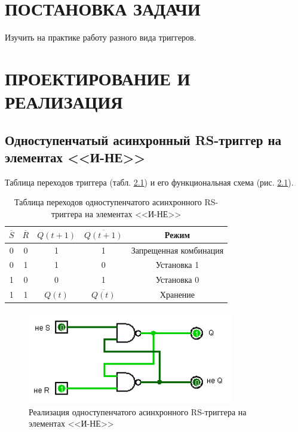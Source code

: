 \documentclass{mirea}
\author     {Краснов Н.O.}
\begin{document}
	
\chapter{ПОСТАНОВКА ЗАДАЧИ}
	Изучить на практике работу разного вида триггеров.
	
\chapter{ПРОЕКТИРОВАНИЕ И РЕАЛИЗАЦИЯ}
\section{Одноступенчатый асинхронный RS-триггер на элементах <<И-НЕ>>}
	Таблица переходов триггера (табл. \ref{table:1stepAsyncRSNAND}) и его функциональная схема (рис. \ref{fig:1stepAsyncRSNAND}).
	
	\begin{table}[H]
		\centering
		\caption{Таблица переходов одноступенчатого асинхронного RS-триггера на элементах <<И-НЕ>>}
		\label{table:1stepAsyncRSNAND}
		\begin{tabular}{c|c|c|c|c}
			$ \overline{S} $ & $ \overline{R} $ & $ Q(t+1) $ & $ \overline{Q(t+1)} $ & Режим \\
			\hline
			0 & 0 & 1 & 1 & Запрещенная комбинация \\
			\hline
			0 & 1 & 1 & 0 & Установка 1 \\
			\hline
			1 & 0 & 0 & 1 & Установка 0 \\
			\hline
			1 & 1 & $ Q(t) $ & $\overline{Q(t)}$ & Хранение
		\end{tabular}
	\end{table}

	\begin{figure}[H]
		\centering
		\includegraphics[width=0.8\textwidth]{1stepAsyncRSNAND.png}
		\caption{Реализация одноступенчатого асинхронного RS-триггера на элементах <<И-НЕ>>}
		\label{fig:1stepAsyncRSNAND}
	\end{figure}
	
\clearpage
\end{document}
